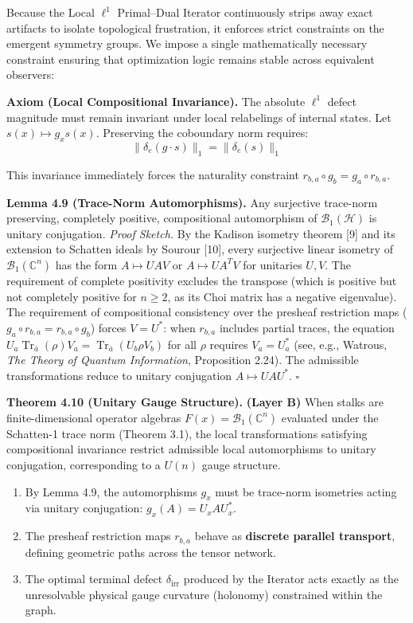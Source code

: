 \documentclass[
]{article}
\providecommand{\tightlist}{%
  \setlength{\itemsep}{0pt}\setlength{\parskip}{0pt}}
\begin{document}
Because the Local \(\ell^1\) Primal--Dual Iterator continuously strips
away exact artifacts to isolate topological frustration, it enforces
strict constraints on the emergent symmetry groups. We impose a single
mathematically necessary constraint ensuring that optimization logic
remains stable across equivalent observers:

\textbf{Axiom (Local Compositional Invariance).} The absolute \(\ell^1\)
defect magnitude must remain invariant under local relabelings of
internal states. Let \(s(x) \mapsto g_x s(x)\). Preserving the
coboundary norm requires:
\[ \|\delta_e(g \cdot s)\|_1 = \|\delta_e(s)\|_1 \]

This invariance immediately forces the naturality constraint
\(r_{b,a} \circ g_b = g_a \circ r_{b,a}\).

\textbf{Lemma 4.9 (Trace-Norm Automorphisms).} Any surjective trace-norm
preserving, completely positive, compositional automorphism of
\(\mathcal{B}_1(\mathcal{H})\) is unitary conjugation. \emph{Proof
Sketch.} By the Kadison isometry theorem {[}9{]} and its extension to
Schatten ideals by Sourour {[}10{]}, every surjective linear isometry of
\(\mathcal{B}_1(\mathbb{C}^n)\) has the form \(A \mapsto UAV\) or
\(A \mapsto UA^T V\) for unitaries \(U, V\). The requirement of complete
positivity excludes the transpose (which is positive but not completely
positive for \(n \ge 2\), as its Choi matrix has a negative eigenvalue).
The requirement of compositional consistency over the presheaf
restriction maps (\(g_a \circ r_{b,a} = r_{b,a} \circ g_b\)) forces
\(V = U^*\): when \(r_{b,a}\) includes partial traces, the equation
\(U_a \operatorname{Tr}_{\bar{a}}(\rho) V_a = \operatorname{Tr}_{\bar{a}}(U_b \rho V_b)\)
for all \(\rho\) requires \(V_a = U_a^*\) (see, e.g., Watrous, \emph{The
Theory of Quantum Information}, Proposition 2.24). The admissible
transformations reduce to unitary conjugation \(A \mapsto UAU^*\).
\(\square\)

\textbf{Theorem 4.10 (Unitary Gauge Structure).} \textbf{(Layer B)} When
stalks are finite-dimensional operator algebras
\(F(x) = \mathcal{B}_1(\mathbb{C}^n)\) evaluated under the Schatten-1
trace norm (Theorem 3.1), the local transformations satisfying
compositional invariance restrict admissible local automorphisms to
unitary conjugation, corresponding to a \(U(n)\) gauge structure.

\begin{enumerate}
\def\labelenumi{\arabic{enumi}.}
\tightlist
\item
  By Lemma 4.9, the automorphisms \(g_x\) must be trace-norm isometries
  acting via unitary conjugation: \(g_x(A) = U_x A U_x^*\).
\item
  The presheaf restriction maps \(r_{b,a}\) behave as \textbf{discrete
  parallel transport}, defining geometric paths across the tensor
  network.
\item
  The optimal terminal defect \(\delta_{\text{irr}}\) produced by the
  Iterator acts exactly as the unresolvable physical gauge curvature
  (holonomy) constrained within the graph.
\end{enumerate}
\end{document}
